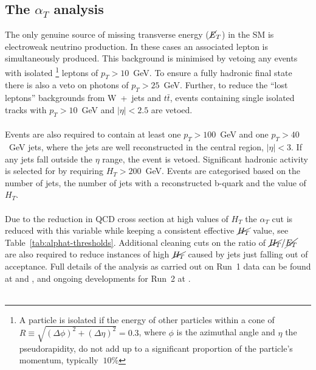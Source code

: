 \subsection{The \boldmath $\alpha_T$ analysis}

The only genuine source of missing transverse energy ($\cancel{E}_T$) in the SM is electroweak neutrino production. In these cases an associated lepton is simultaneously produced. This background is minimised by vetoing any events with isolated \footnote{A particle is isolated if the energy of other particles within a cone of $R\equiv\sqrt{(\Delta\phi)^2+(\Delta\eta)^2}=0.3$, where $\phi$ is the azimuthal angle and $\eta$ the pseudorapidity, do not add up to a significant proportion of the particle's momentum, typically $~10$\%} leptons of $p_T>10$~GeV. To ensure a fully hadronic final state there is also a veto on photons of $p_T>25$~GeV. Further, to reduce the ``lost leptons'' backgrounds from W~+~jets 
and $t\bar{t}$, events containing single isolated tracks with $p_T >10$~GeV and $|\eta| < 2.5$ are vetoed.
\\\\
Events are also required to contain at least one $p_T>100$~GeV and one $p_T>40$~GeV jets, where the jets are well reconstructed in the central region, $|\eta|<3$. If any jets fall outside the $\eta$ range, the event is vetoed. Significant hadronic activity is selected for by requiring $H_T>200$~GeV. Events are categorised based on the number of jets, the number of jets with a reconstructed b-quark and the value of $H_T$. 
\\\\
Due to the reduction in QCD cross section at high values of $H_T$ the $\alpha_T$ cut is reduced with this variable while keeping a consistent effective $\cancel{H_T}$ value, see Table~\ref{tab:alphat-thresholds}. Additional cleaning cuts on the ratio of $\cancel{H_T}/\cancel{E_T}$ are also required to reduce instances of high $\cancel{H_T}$ caused by jets just falling out of acceptance. Full details of the analysis as carried out on Run~1 data can be found at \cite{AlphaT8TeVChatrchyan:2013lya} and \cite{AlphaT_7TeV_PRLChatrchyan:2011zy}, and ongoing developments for Run~2 at \cite{AN-15-004}.
\\\\

